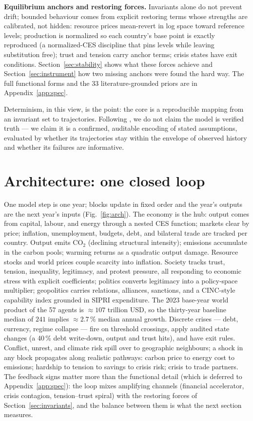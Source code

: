 \documentclass[a4paper,fleqn]{cas-sc}
\begin{document}
\textbf{Equilibrium anchors and restoring forces.} Invariants alone do not prevent drift;
bounded behaviour comes from explicit restoring terms whose strengths are calibrated, not
hidden: resource prices mean-revert in log space toward reference levels; production is
normalized so each country's base point is exactly reproduced (a normalized-CES discipline that
pins levels while leaving substitution free); trust and tension carry anchor terms; crisis
states have exit conditions. Section~\ref{sec:stability} shows what these forces achieve and
Section~\ref{sec:instrument} how two missing anchors were found the hard way. The full
functional forms and the 33 literature-grounded priors are in Appendix~\ref{app:spec}.

Determinism, in this view, is the point: the core is a reproducible mapping from an invariant
set to trajectories. Following \citet{oreskes1994}, we do not claim the model is verified truth
--- we claim it is a confirmed, auditable encoding of stated assumptions, evaluated by whether
its trajectories stay within the envelope of observed history and whether its failures are
informative.

\section{Architecture: one closed loop}
\label{sec:arch}

One model step is one year; blocks update in fixed order and the year's outputs are the next
year's inputs (Fig.~\ref{fig:arch}). The economy is the hub: output comes from capital, labour,
and energy through a nested CES function; markets clear by price; inflation, unemployment,
budgets, debt, and bilateral trade are tracked per country. Output emits CO$_2$ (declining
structural intensity); emissions accumulate in the carbon pools; warming returns as a quadratic
output damage. Resource stocks and world prices couple scarcity into inflation. Society tracks
trust, tension, inequality, legitimacy, and protest pressure, all responding to economic stress
with explicit coefficients; politics converts legitimacy into a policy-space multiplier;
geopolitics carries relations, alliances, sanctions, and a CINC-style capability index
\citep{singer1972} grounded in SIPRI expenditure. The 2023 base-year world product of the 57
agents is ${\approx}107$ trillion USD, so the thirty-year baseline median of $241$ implies
${\approx}2.7\,\%$ median annual growth. Discrete crises --- debt, currency, regime collapse --- fire on threshold
crossings, apply audited state changes (a 40\,\% debt write-down, output and trust hits), and
have exit rules. Conflict, unrest, and climate risk spill over to geographic neighbours; a
shock in any block propagates along realistic pathways: carbon price to energy cost to
emissions; hardship to tension to savings to crisis risk; crisis to trade partners. The
feedback signs matter more than the functional detail (which is deferred to
Appendix~\ref{app:spec}): the loop mixes amplifying channels (financial accelerator, crisis
contagion, tension--trust spiral) with the restoring forces of Section~\ref{sec:invariants},
and the balance between them is what the next section measures.
\end{document}
